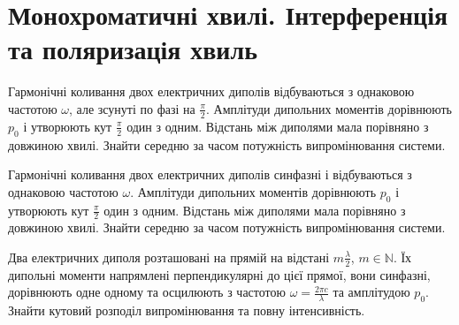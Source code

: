 \section{Монохроматичні хвилі. Інтерференція та поляризація хвиль}


\begin{problem}
Гармонічні коливання двох електричних диполів відбуваються з однаковою частотою $\omega$, але зсунуті по фазі на $\frac{\pi}{2}$. Амплітуди дипольних моментів дорівнюють $p_0$ і утворюють кут $\frac{\pi}{2}$ один з одним. Відстань між диполями мала порівняно з довжиною хвилі. Знайти середню за часом потужність випромінювання системи.
\end{problem}

\begin{problem}
Гармонічні коливання двох електричних диполів синфазні і відбуваються з однаковою частотою $\omega$. Амплітуди дипольних моментів дорівнюють $p_0$ і утворюють кут $\frac{\pi}{2}$ один з одним. Відстань між диполями мала порівняно з довжиною хвилі. Знайти середню за часом потужність випромінювання системи.
\end{problem}

\begin{problem}
Два електричних диполя розташовані на прямій на відстані $m\frac{\lambda}{2}$, $m \in \mathbb{N}$. Їх дипольні моменти напрямлені перпендикулярні до цієї прямої, вони синфазні, дорівнюють одне одному та осцилюють з частотою $\omega  = \frac{2\pi c}{\lambda}$ та амплітудою $p_0$. Знайти кутовий розподіл випромінювання та повну інтенсивність.
\end{problem}

